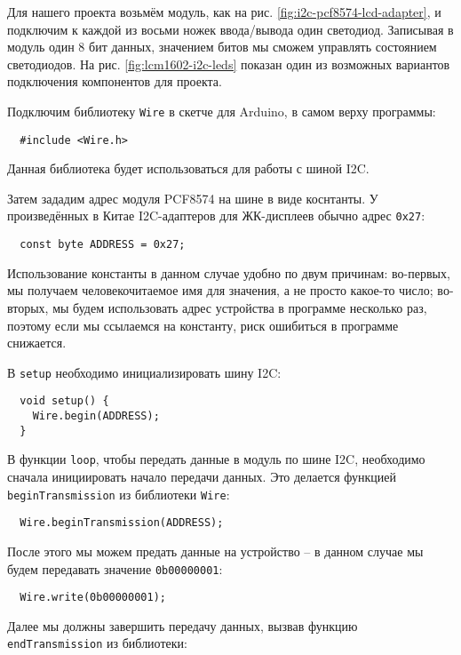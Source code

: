 \documentclass[../sparc.tex]{subfiles}
\begin{document}
Для нашего проекта возьмём модуль, как на
рис. \ref{fig:i2c-pcf8574-lcd-adapter}, и подключим к каждой из восьми ножек
ввода/вывода один светодиод.  Записывая в модуль один 8 бит данных, значением
битов мы сможем управлять состоянием светодиодов.  На
рис. \ref{fig:lcm1602-i2c-leds} показан один из возможных вариантов подключения
компонентов для проекта.

Подключим библиотеку \texttt{Wire} в скетче для Arduino, в самом верху
программы:

\begin{verbatim}
  #include <Wire.h>
\end{verbatim}

Данная библиотека будет использоваться для работы с шиной I2C.

Затем зададим адрес модуля PCF8574 на шине в виде коснтанты.  У произведённых в
Китае I2C-адаптеров для ЖК-дисплеев обычно адрес \texttt{0x27}:

\begin{verbatim}
  const byte ADDRESS = 0x27;
\end{verbatim}

Использование константы в данном случае удобно по двум причинам: во-первых, мы
получаем человекочитаемое имя для значения, а не просто какое-то число;
во-вторых, мы будем использовать адрес устройства в программе несколько раз,
поэтому если мы ссылаемся на константу, риск ошибиться в программе снижается.

В \texttt{setup} необходимо инициализировать шину I2C:

\begin{verbatim}
  void setup() {
    Wire.begin(ADDRESS);
  }
\end{verbatim}

В функции \texttt{loop}, чтобы передать данные в модуль по шине I2C, необходимо
сначала инициировать начало передачи данных.  Это делается функцией
\texttt{beginTransmission} из библиотеки \texttt{Wire}:

\begin{verbatim}
  Wire.beginTransmission(ADDRESS);
\end{verbatim}

После этого мы можем предать данные на устройство -- в данном случае мы будем
передавать значение \texttt{0b00000001}:

\begin{verbatim}
  Wire.write(0b00000001);
\end{verbatim}

Далее мы должны завершить передачу данных, вызвав функцию
\texttt{endTransmission} из библиотеки:
\end{document}
